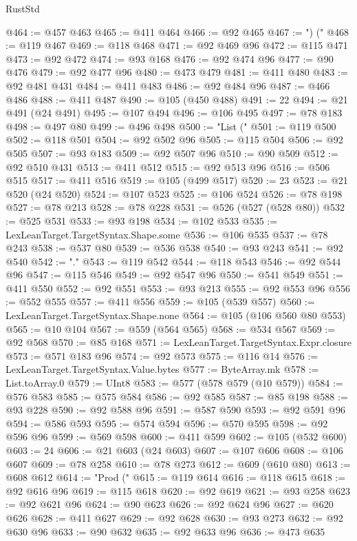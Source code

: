 \begin{lexlean}{RustStd}
\begin{coremodule}
@464 := @457 @463
@465 := @411 @464
@466 := @92 @465
@467 := ") ("
@468 := @119 @467
@469 := @118 @468
@471 := @92 @469 @96
@472 := @115 @471
@473 := @92 @472
@474 := @93 @168
@476 := @92 @474 @96
@477 := @90 @476
@479 := @92 @477 @96
@480 := @473 @479
@481 := @411 @480
@483 := @92 @481 @431
@484 := @411 @483
@486 := @92 @484 @96
@487 := @466 @486
@488 := @411 @487
@490 := @105 (@450 @488)
@491 := 22
@494 := @21 @491 (@24 @491)
@495 := @107 @494
@496 := @106 @495
@497 := @78 @183
@498 := @497 @80
@499 := @496 @498
@500 := "List ("
@501 := @119 @500
@502 := @118 @501
@504 := @92 @502 @96
@505 := @115 @504
@506 := @92 @505
@507 := @93 @183
@509 := @92 @507 @96
@510 := @90 @509
@512 := @92 @510 @431
@513 := @411 @512
@515 := @92 @513 @96
@516 := @506 @515
@517 := @411 @516
@519 := @105 (@499 @517)
@520 := 23
@523 := @21 @520 (@24 @520)
@524 := @107 @523
@525 := @106 @524
@526 := @78 @198
@527 := @78 @213
@528 := @78 @228
@531 := @526 (@527 (@528 @80))
@532 := @525 @531
@533 := @93 @198
@534 := @102 @533
@535 := LexLeanTarget.TargetSyntax.Shape.some
@536 := @106 @535
@537 := @78 @243
@538 := @537 @80
@539 := @536 @538
@540 := @93 @243
@541 := @92 @540
@542 := "."
@543 := @119 @542
@544 := @118 @543
@546 := @92 @544 @96
@547 := @115 @546
@549 := @92 @547 @96
@550 := @541 @549
@551 := @411 @550
@552 := @92 @551
@553 := @93 @213
@555 := @92 @553 @96
@556 := @552 @555
@557 := @411 @556
@559 := @105 (@539 @557)
@560 := LexLeanTarget.TargetSyntax.Shape.none
@564 := @105 (@106 @560 @80 @553)
@565 := @10 @104
@567 := @559 (@564 @565)
@568 := @534 @567
@569 := @92 @568
@570 := @85 @168
@571 := LexLeanTarget.TargetSyntax.Expr.closure
@573 := @571 @183 @96
@574 := @92 @573
@575 := @116 @14
@576 := LexLeanTarget.TargetSyntax.Value.bytes
@577 := ByteArray.mk
@578 := List.toArray.{0}
@579 := UInt8
@583 := @577 (@578 @579 (@10 @579))
@584 := @576 @583
@585 := @575 @584
@586 := @92 @585
@587 := @85 @198
@588 := @93 @228
@590 := @92 @588 @96
@591 := @587 @590
@593 := @92 @591 @96
@594 := @586 @593
@595 := @574 @594
@596 := @570 @595
@598 := @92 @596 @96
@599 := @569 @598
@600 := @411 @599
@602 := @105 (@532 @600)
@603 := 24
@606 := @21 @603 (@24 @603)
@607 := @107 @606
@608 := @106 @607
@609 := @78 @258
@610 := @78 @273
@612 := @609 (@610 @80)
@613 := @608 @612
@614 := "Prod ("
@615 := @119 @614
@616 := @118 @615
@618 := @92 @616 @96
@619 := @115 @618
@620 := @92 @619
@621 := @93 @258
@623 := @92 @621 @96
@624 := @90 @623
@626 := @92 @624 @96
@627 := @620 @626
@628 := @411 @627
@629 := @92 @628
@630 := @93 @273
@632 := @92 @630 @96
@633 := @90 @632
@635 := @92 @633 @96
@636 := @473 @635

\end{coremodule}
\end{lexlean}
